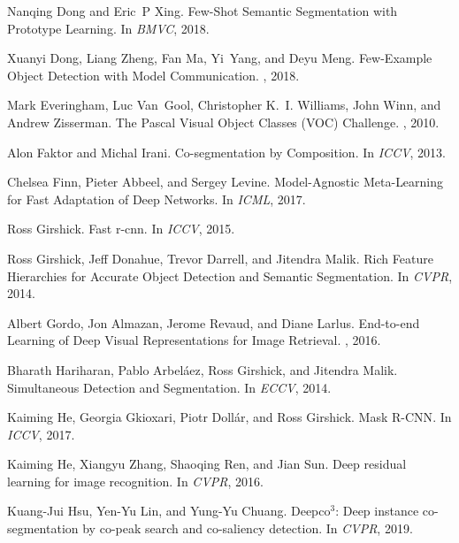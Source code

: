 \documentclass{article}
\begin{document}
{\begin{thebibliography}{10}
Nanqing Dong and Eric~P Xing.
\newblock Few-{Shot} {Semantic} {Segmentation} with {Prototype} {Learning}.
\newblock In {\em {BMVC}}, 2018.

Xuanyi Dong, Liang Zheng, Fan Ma, Yi~Yang, and Deyu Meng.
\newblock Few-{Example} {Object} {Detection} with {Model} {Communication}.
, 2018.

Mark Everingham, Luc Van~Gool, Christopher K.~I. Williams, John Winn, and
  Andrew Zisserman.
\newblock The {Pascal} {Visual} {Object} {Classes} ({VOC}) {Challenge}.
, 2010.

Alon Faktor and Michal Irani.
\newblock Co-segmentation by {Composition}.
\newblock In {\em {ICCV}}, 2013.

Chelsea Finn, Pieter Abbeel, and Sergey Levine.
\newblock Model-{Agnostic} {Meta}-{Learning} for {Fast} {Adaptation} of {Deep}
  {Networks}.
\newblock In {\em ICML}, 2017.

Ross Girshick.
\newblock Fast r-cnn.
\newblock In {\em {ICCV}}, 2015.

Ross Girshick, Jeff Donahue, Trevor Darrell, and Jitendra Malik.
\newblock Rich {Feature} {Hierarchies} for {Accurate} {Object} {Detection} and
  {Semantic} {Segmentation}.
\newblock In {\em {CVPR}}, 2014.

Albert Gordo, Jon Almazan, Jerome Revaud, and Diane Larlus.
\newblock End-to-end {Learning} of {Deep} {Visual} {Representations} for
  {Image} {Retrieval}.
, 2016.

Bharath Hariharan, Pablo Arbeláez, Ross Girshick, and Jitendra Malik.
\newblock Simultaneous {Detection} and {Segmentation}.
\newblock In {\em {ECCV}}, 2014.

Kaiming He, Georgia Gkioxari, Piotr Dollár, and Ross Girshick.
\newblock Mask {R}-{CNN}.
\newblock In {\em {ICCV}}, 2017.

Kaiming He, Xiangyu Zhang, Shaoqing Ren, and Jian Sun.
\newblock Deep residual learning for image recognition.
\newblock In {\em {CVPR}}, 2016.

Kuang-Jui Hsu, Yen-Yu Lin, and Yung-Yu Chuang.
\newblock Deepco$^3$: Deep instance co-segmentation by co-peak search and
  co-saliency detection.
\newblock In {\em {CVPR}}, 2019.


\end{thebibliography}}
\end{document}
